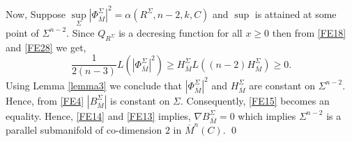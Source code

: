\documentclass[11pt]{amsart}
\numberwithin{equation}{section}
\begin{document}
Now, Suppose $\sup\limits_{\Sigma} {\left|\Phi^{\Sigma}_{\overline{M}}\right|^2}= \alpha\left(R^{\Sigma}, n-2, k, C\right)$ and $\sup$ is attained at some point of $\Sigma^{n-2}$. Since $Q_{R^{\Sigma}}$ is a decresing function for all $x\ge 0$ then from \eqref{FE18} and \eqref{FE28} we get,
\begin{equation}
     \frac{1}{2(n-3)} L\left(\left|\Phi^{\Sigma}_{\overline{M}}\right|^2\right) \ge H^{\Sigma}_{\overline{M}}L\left((n-2)H^{\Sigma}_{\overline{M}}\right)\ge 0.
\end{equation}
Using Lemma \ref{lemma3} we conclude that $\left|\Phi^{\Sigma}_{\overline{M}}\right|^2$ and $H^{\Sigma}_{\overline{M}}$ are constant on $\Sigma^{n-2}$. Hence, from \eqref{FE4} $\left|B^{\Sigma}_{\overline{M}}\right|$ is constant on $\Sigma$. Consequently, \eqref{FE15} becomes an equality. Hence, \eqref{FE14} and \eqref{FE13} implies, $\nabla B^{\Sigma}_{\overline{M}}=0$ which implies $\Sigma^{n-2}$ is a parallel submanifold of co-dimension $2$ in $\overline{M}^n(C)$. 
\qed
\end{document}
